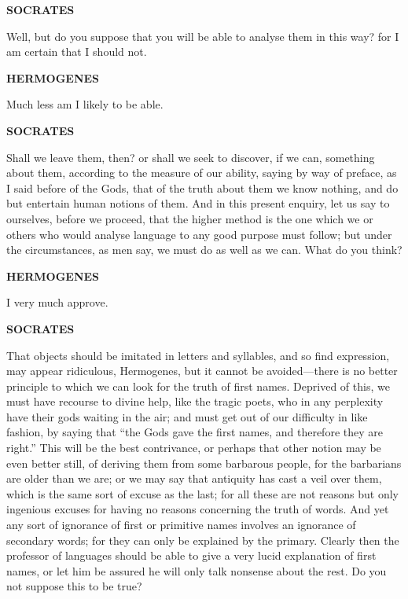 \documentclass[11pt,letter]{article}
\begin{document}
\par \textbf{SOCRATES}
\par   Well, but do you suppose that you will be able to analyse them in this way? for I am certain that I should not.

\par \textbf{HERMOGENES}
\par   Much less am I likely to be able.

\par \textbf{SOCRATES}
\par   Shall we leave them, then? or shall we seek to discover, if we can, something about them, according to the measure of our ability, saying by way of preface, as I said before of the Gods, that of the truth about them we know nothing, and do but entertain human notions of them. And in this present enquiry, let us say to ourselves, before we proceed, that the higher method is the one which we or others who would analyse language to any good purpose must follow; but under the circumstances, as men say, we must do as well as we can. What do you think?

\par \textbf{HERMOGENES}
\par   I very much approve.

\par \textbf{SOCRATES}
\par   That objects should be imitated in letters and syllables, and so find expression, may appear ridiculous, Hermogenes, but it cannot be avoided—there is no better principle to which we can look for the truth of first names. Deprived of this, we must have recourse to divine help, like the tragic poets, who in any perplexity have their gods waiting in the air; and must get out of our difficulty in like fashion, by saying that “the Gods gave the first names, and therefore they are right.” This will be the best contrivance, or perhaps that other notion may be even better still, of deriving them from some barbarous people, for the barbarians are older than we are; or we may say that antiquity has cast a veil over them, which is the same sort of excuse as the last; for all these are not reasons but only ingenious excuses for having no reasons concerning the truth of words. And yet any sort of ignorance of first or primitive names involves an ignorance of secondary words; for they can only be explained by the primary. Clearly then the professor of languages should be able to give a very lucid explanation of first names, or let him be assured he will only talk nonsense about the rest. Do you not suppose this to be true?
\end{document}
